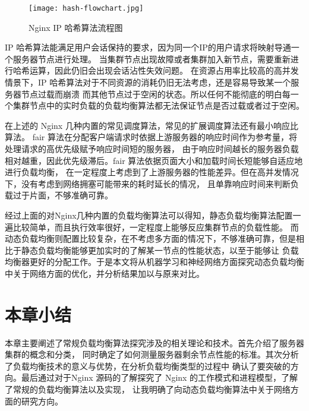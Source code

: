 \begin{figure}[htb]
  \centering
  \texttt{[image: hash-flowchart.jpg]}
  \caption{Nginx IP 哈希算法流程图}
\end{figure}

IP 哈希算法能满足用户会话保持的要求，因为同一个IP的用户请求将映射导通一个服务器节点进行处理。
当集群节点出现故障或者集群加入新节点，需要重新进行哈希运算，因此仍旧会出现会话沾性失效问题。
在资源占用率比较高的高并发情景下，IP 哈希算法对于不同资源的消耗仍旧无法考虑，还是容易导致某一个服务器节点过载而崩溃
而其他节点过于空闲的状态。所以任何不能彻底的明白每一个集群节点中的实时负载的负载均衡算法都无法保证节点是否过载或者过于空闲。

在上述的 Nginx 几种内置的常见调度算法，常见的扩展调度算法还有最小响应比算法。
fair 算法在分配客户端请求时依据上游服务器的响应时间作为参考量，将处理请求的高优先级赋予响应时间短的服务器，
由于响应时间越长的服务器负载相对越重，因此优先级滞后。fair 算法依据页面大小和加载时间长短能够自适应地进行负载均衡，
在一定程度上考虑到了上游服务器的性能差异。但在高并发情况下，没有考虑到网络拥塞可能带来的耗时延长的情况，
且单靠响应时间来判断负载过于片面，不够准确可靠\cite{张艳肖2023基于Fair函数神经网络的厚度传感器输出特性分析}。

经过上面的对Nginx几种内置的负载均衡算法可以得知，静态负载均衡算法配置一遍比较简单，而且执行效率很好，一定程度上能够反应集群节点的负载性能。
而动态负载均衡则配置比较复杂，在不考虑多方面的情况下，不够准确可靠，但是相比于静态负载均衡能够更加实时的了解某一节点的性能状态，以至于能够让
负载均衡器更好的分配工作。于是本文将从机器学习和神经网络方面探究动态负载均衡中关于网络方面的优化，并分析结果加以与原来对比。

\section{本章小结}

本章主要阐述了常规负载均衡算法探究涉及的相关理论和技术。首先介绍了服务器集群的概念和分类，
同时确定了如何测量服务器剩余节点性能的标准。其次分析了负载均衡技术的意义与优势，在分析负载均衡类型的过程中
确认了要突破的方向。最后通过对于Nginx 源码的了解探究了 Nginx 的工作模式和进程模型，了解了常规的负载均衡算法以及实现，
让我明确了向动态负载均衡算法中关于网络方面的研究方向。
